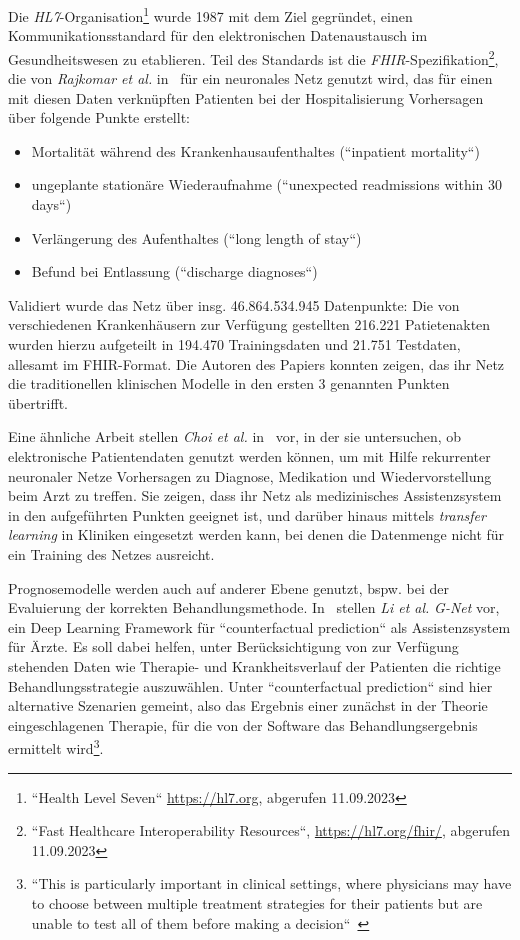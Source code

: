 Die \textit{HL7}-Organisation\footnote{
    ``Health Level Seven`` \url{https://hl7.org}, abgerufen 11.09.2023
} wurde 1987 mit dem Ziel gegründet, einen Kommunikationsstandard für den elektronischen Datenaustausch im Gesundheitswesen zu etablieren. Teil des Standards ist die \textit{FHIR}-Spezifikation\footnote{
    ``Fast Healthcare Interoperability Resources``, \url{https://hl7.org/fhir/}, abgerufen 11.09.2023
}, die von \textit{Rajkomar et al.} in~\cite{ROC+18} für ein neuronales Netz genutzt wird, das für einen mit diesen Daten verknüpften Patienten bei der Hospitalisierung Vorhersagen über folgende Punkte erstellt:


\begin{itemize}
    \item Mortalität während des Krankenhausaufenthaltes (``inpatient mortality``)
    \item ungeplante stationäre Wiederaufnahme (``unexpected readmissions within 30 days``)
    \item Verlängerung des Aufenthaltes (``long length of stay``)
    \item Befund bei Entlassung (``discharge diagnoses``)
\end{itemize}


Validiert wurde das Netz über insg. 46.864.534.945 Datenpunkte: Die von verschiedenen Krankenhäusern zur Verfügung gestellten 216.221 Patietenakten wurden hierzu aufgeteilt in 194.470 Trainingsdaten und 21.751 Testdaten, allesamt im FHIR-Format. Die Autoren des Papiers konnten zeigen, das ihr Netz die traditionellen klinischen Modelle in den ersten 3 genannten Punkten übertrifft.

Eine ähnliche Arbeit stellen \textit{Choi et al.} in~\cite{CBS+16} vor, in der sie untersuchen, ob elektronische Patientendaten genutzt werden können, um mit Hilfe rekurrenter neuronaler Netze Vorhersagen zu Diagnose, Medikation und Wiedervorstellung beim Arzt zu treffen. Sie zeigen, dass ihr Netz als medizinisches Assistenzsystem in den aufgeführten Punkten geeignet ist, und darüber hinaus mittels \textit{transfer learning} in Kliniken eingesetzt werden kann, bei denen die Datenmenge nicht für ein Training des Netzes ausreicht.

Prognosemodelle werden auch auf anderer Ebene genutzt, bspw. bei der Evaluierung der korrekten Behandlungsmethode. In~\cite{LHL+21} stellen \textit{Li et al.} \textit{G-Net} vor, ein Deep Learning Framework für ``counterfactual prediction`` als Assistenzsystem für Ärzte. Es soll dabei helfen, unter Berücksichtigung von zur Verfügung stehenden Daten wie Therapie- und Krankheitsverlauf der Patienten die richtige Behandlungsstrategie auszuwählen. Unter ``counterfactual prediction`` sind hier alternative Szenarien gemeint, also das Ergebnis einer zunächst in der Theorie eingeschlagenen Therapie, für die von der Software das
Behandlungsergebnis ermittelt wird\footnote{
    ``This is particularly important in clinical settings, where physicians may have to choose between multiple treatment strategies for their patients but are unable to test all of them before making a decision``~\cite[282]{LHL+21}
}.

